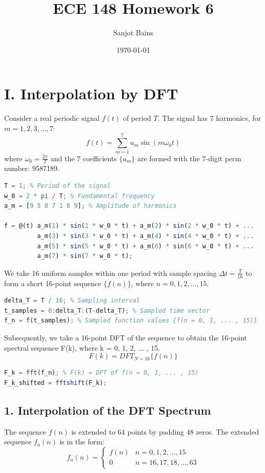 \documentclass[12pt]{article}
\title{ECE 148 Homework 6}
\author{Sanjot Bains}
\date{\today}
\begin{document}
\maketitle

\section*{I. Interpolation by DFT}
Consider a real periodic signal $f(t)$ of period $T$. The signal has 7 harmonics, for $m = 1, 2, 3, \ldots, 7$:
\[ f(t) = \sum_{m=1}^7 a_m \sin(m \omega_0 t) \]
where $\omega_0 = \frac{2\pi}{T}$ and the 7 coefficients $\{a_m\}$ are formed with the 7-digit perm number: 9587189.

\begin{lstlisting}[language=Octave, caption=Signal Definition]
T = 1; % Period of the signal
w_0 = 2 * pi / T; % Fundamental frequency
a_m = [9 5 8 7 1 8 9]; % Amplitude of harmonics

f = @(t) a_m(1) * sin(1 * w_0 * t) + a_m(2) * sin(2 * w_0 * t) + ...
         a_m(3) * sin(3 * w_0 * t) + a_m(4) * sin(4 * w_0 * t) + ...
         a_m(5) * sin(5 * w_0 * t) + a_m(6) * sin(6 * w_0 * t) + ...
         a_m(7) * sin(7 * w_0 * t);
\end{lstlisting}

We take 16 uniform samples within one period with sample spacing $\Delta t = \frac{T}{16}$ to form a short 16-point sequence $\{f(n)\}$, where $n = 0, 1, 2, \ldots, 15$.

\begin{lstlisting}[language=Octave, caption=Sampling]
delta_T = T / 16; % Sampling interval
t_samples = 0:delta_T:(T-delta_T); % Sampled time vector
f_n = f(t_samples); % Sampled function values {f(n = 0, 1, ... , 15)}
\end{lstlisting}

Subsequently, we take a 16-point DFT of the sequence to obtain the 16-point spectral sequence F(k), where k = 0, 1, 2, ... , 15.
\[  F(k) = DFT_{N = 16} \{f(n)\}  \]

\begin{lstlisting}[language=Octave, caption=16-pt DFT]
F_k = fft(f_n); % F(k) = DFT of f(n = 0, 1, ... , 15)
F_k_shifted = fftshift(F_k);
\end{lstlisting}


\newpage
\subsection*{1. Interpolation of the DFT Spectrum}
The sequence $f(n)$ is extended to 64 points by padding 48 zeros. The extended sequence $f_a(n)$ is in the form:
\[ f_a(n) = \begin{cases}
f(n) & n = 0, 1, 2, \ldots, 15 \\
0 & n = 16, 17, 18, \ldots, 63
\end{cases} \]
\end{document}

